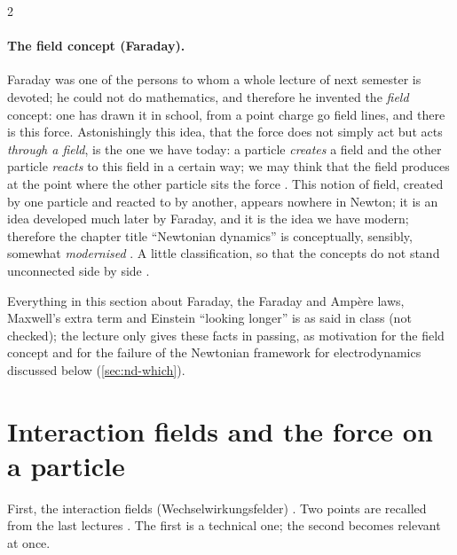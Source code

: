 \begin{paracol}{2}
\paragraph{The field concept (Faraday).} Faraday was one of the persons to whom a whole lecture of next semester is devoted; he could not do mathematics, and therefore he invented the \emph{field} concept: one has drawn it in school, from a point charge go field lines, and there
is this force. Astonishingly this idea, that the force does not simply act but acts \emph{through a field}, is the one we have today: a particle \emph{creates} a field and the other particle \emph{reacts} to this field in a certain way; we may think that the field produces
at the point where the other particle sits the force . This notion of field, created by one particle and reacted to by another, appears nowhere in Newton; it is an idea developed much later by Faraday, and it is the idea we have modern; therefore the
chapter title ``Newtonian dynamics'' is conceptually, sensibly, somewhat \emph{modernised} . A little classification, so that the concepts do not stand unconnected side by side .

\begin{coursenote}
Everything in this section about Faraday, the Faraday and Amp\`ere laws, Maxwell's extra term and Einstein ``looking longer'' is as said in class (not checked); the lecture only gives these facts in passing, as motivation for the field concept and for the failure of the Newtonian
framework for electrodynamics discussed below (\cref{sec:nd-which}).
\end{coursenote}

\section{Interaction fields and the force on a particle}\label{sec:nd-fields}

First, the interaction fields (Wechselwirkungsfelder) . Two points are recalled from the last lectures . The first is a technical one; the second becomes relevant at once.


\end{paracol}
